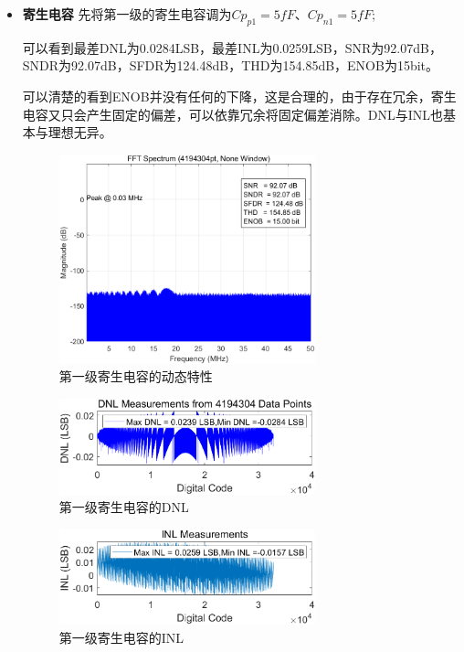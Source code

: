 \documentclass[cs4size,a4paper]{ctexart}
\numberwithin{equation}{section}
\numberwithin{table}{section}
\numberwithin{figure}{section}
\begin{document}
\begin{itemize}
		\item \textbf{寄生电容} 先将第一级的寄生电容调为$Cp_{p1}  = 5fF $、$ Cp_{n1} = 5fF;$ 
		
		可以看到最差DNL为0.0284LSB，最差INL为0.0259LSB，SNR为92.07dB，SNDR为92.07dB，SFDR为124.48dB，THD为154.85dB，ENOB为15bit。
		
		可以清楚的看到ENOB并没有任何的下降，这是合理的，由于存在冗余，寄生电容又只会产生固定的偏差，可以依靠冗余将固定偏差消除。DNL与INL也基本与理想无异。
		\begin{figure}[H]
			\centering
			\includegraphics[width=0.7\textwidth]{pic/Co/DFT1.png}
			\caption{第一级寄生电容的动态特性} 
		\end{figure}

		\begin{figure}[H]
			\centering
			\includegraphics[width=0.7\textwidth]{pic/Co/DNL1.png}
			\caption{第一级寄生电容的DNL} 
		\end{figure}

		\begin{figure}[H]
			\centering
			\includegraphics[width=0.7\textwidth]{pic/Co/INL1.png}
			\caption{第一级寄生电容的INL} 
		\end{figure}


\end{itemize}
\end{document}
